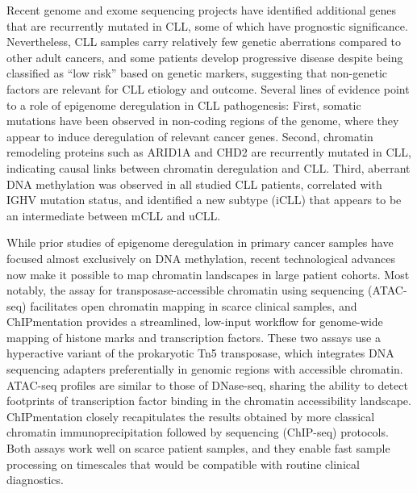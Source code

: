\documentclass[10pt,]{article}
\begin{document}
Recent genome and exome sequencing projects have identified additional
genes that are recurrently mutated in CLL\citep{Landau2015, Puente2015},
some of which have prognostic significance. Nevertheless, CLL samples
carry relatively few genetic aberrations compared to other adult
cancers\citep{Lawrence2013}, and some patients develop progressive
disease despite being classified as ``low risk'' based on genetic
markers, suggesting that non-genetic factors are relevant for CLL
etiology and outcome. Several lines of evidence point to a role of
epigenome deregulation in CLL pathogenesis: First, somatic mutations
have been observed in non-coding regions of the genome, where they
appear to induce deregulation of relevant cancer
genes\citep{Puente2015}. Second, chromatin remodeling proteins such as
ARID1A and CHD2 are recurrently mutated in
CLL\citep{Landau2015, Puente2015}, indicating causal links between
chromatin deregulation and CLL. Third, aberrant DNA methylation was
observed in all studied CLL
patients\citep{Kulis2012, Landau2014, Oakes2014}, correlated with IGHV
mutation status, and identified a new subtype (iCLL) that appears to be
an intermediate between mCLL and uCLL\citep{Kulis2012, Queiros2014}.

While prior studies of epigenome deregulation in primary cancer samples
have focused almost exclusively on DNA methylation\citep{Baylin2011},
recent technological advances now make it possible to map chromatin
landscapes in large patient cohorts. Most notably, the assay for
transposase-accessible chromatin using sequencing (ATAC-seq) facilitates
open chromatin mapping in scarce clinical samples\citep{Buenrostro2013},
and ChIPmentation provides a streamlined, low-input workflow for
genome-wide mapping of histone marks and transcription
factors\citep{Schmidl2015}. These two assays use a hyperactive variant
of the prokaryotic Tn5 transposase, which integrates DNA sequencing
adapters preferentially in genomic regions with accessible chromatin.
ATAC-seq profiles are similar to those of DNase-seq, sharing the ability
to detect footprints of transcription factor binding in the chromatin
accessibility landscape\citep{Risca2015}. ChIPmentation closely
recapitulates the results obtained by more classical chromatin
immunoprecipitation followed by sequencing (ChIP-seq)
protocols\citep{Schmidl2015}. Both assays work well on scarce patient
samples, and they enable fast sample processing on timescales that would
be compatible with routine clinical diagnostics.
\end{document}
